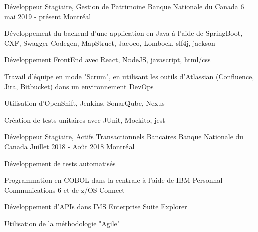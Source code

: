 \begin{cventries}
  \cventry
    {Développeur Stagiaire, Gestion de Patrimoine}
    {Banque Nationale du Canada}
    {6 mai 2019  - présent}
    {Montréal}
    {
      \begin{cvitems}
      \item{Développement du backend d'une application en Java à l'aide de SpringBoot, CXF, Swagger-Codegen, MapStruct, Jacoco, Lombock, slf4j, jackson}
      \item{Développement FrontEnd avec React, NodeJS, javascript, html/css}
      \item{Travail d'équipe en mode "Scrum", en utilisant les outils d'Atlassian (Confluence, Jira, Bitbucket) dans un environnement DevOps}
      \item{Utilisation d'OpenShift, Jenkins, SonarQube, Nexus}
      \item{Création de tests unitaires avec JUnit, Mockito, jest}
      \end{cvitems}
    }
  \cventry
    {Développeur Stagiaire, Actifs Transactionnels Bancaires}
    {Banque Nationale du Canada}
    {Juillet 2018 - Août 2018}
    {Montréal}
    {
      \begin{cvitems}
      \item{Développement de tests automatisés}
        \item {Programmation en COBOL dans la centrale à l'aide de IBM Personnal Communications 6 et de z/OS Connect}
        \item {Développement d'APIs dans IMS Enterprise Suite Explorer}
        \item {Utilisation de la méthodologie "Agile"}
      \end{cvitems}
    }
\end{cventries}
